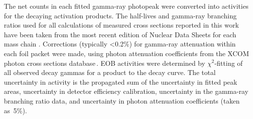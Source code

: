 The net  counts in each fitted gamma-ray photopeak were converted into  activities for the decaying  activation products.
% 
% 
% 
The   half-lives and gamma-ray branching ratios  used for all calculations of measured cross sections reported in this work  have been taken from the most recent edition of  Nuclear Data Sheets for each  mass chain
\cite{PhysRevC.96.014613,Singh2015a,Chen2011a,Wu2000,Burrows2007,Burrows2006,Burrows2008,Wang2017,Dong2015,Dong2014,JUNDE2008787,Junde2011,Bhat1998,Nesaraja2010,Browne2013,Zuber20151,NICHOLS2012973,ERJUN2001,Singh2007}.
Corrections (typically \textless0.2\%) for gamma-ray attenuation within each foil packet were made, using  photon attenuation coefficients from the XCOM photon cross sections database\,\cite{berger2011xcom}.
EOB activities were determined by $\chi^2$-fitting of all observed decay gammas for a product to the decay curve.
The total  uncertainty in  activity is the propagated sum of the uncertainty in  fitted peak areas, uncertainty in detector efficiency calibration,  uncertainty in the gamma-ray branching ratio data, and uncertainty in photon attenuation coefficients (taken as~5\%).




